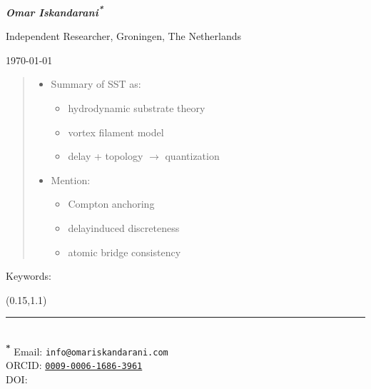 \documentclass[11pt]{article}
\theoremstyle{definition}
\theoremstyle{plain}
\theoremstyle{remark}
\begin{document}
    \thispagestyle{empty}%
    \begin{center}
        \Large \bfseries \papertitle \par \vspace{1cm}
        {\Large \itshape \textbf{Omar Iskandarani}\textsuperscript{\textbf{*}} \par} \vspace{0.5cm}
        {\small Independent Researcher, Groningen, The Netherlands\par} \vspace{0.5cm}
        {\today \par}  \vspace{0.5cm}
    \end{center}
    
    \begin{abstract}
        
        \begin{itemize}
            \item Summary of SST as:
            \begin{itemize}
                \item hydrodynamic substrate theory
                \item vortex filament model
                \item delay + topology $\rightarrow$ quantization
            \end{itemize}
            \item Mention:
            \begin{itemize}
                \item Compton anchoring
                \item delay\-induced discreteness
                \item atomic bridge consistency
            \end{itemize}
        \end{itemize}
    
    
    \end{abstract}
    Keywords: \paperkeywords
    
    
    \begin{textblock*}{1\textwidth}(0.15\textwidth,1.1\textheight)\raggedright\footnotesize\renewcommand{\arraystretch}{1.0} \noindent\rule{\textwidth}{0.4pt}\\[0.5em]
        \textsuperscript{\textbf{*}} Email: \texttt{info@omariskandarani.com}\\
        ORCID: \texttt{\href{https://orcid.org/0009-0006-1686-3961}{0009-0006-1686-3961}}\\
        DOI: \href{https://doi.org/\paperdoi}{\paperdoi}
    \end{textblock*}
    
\end{document}
